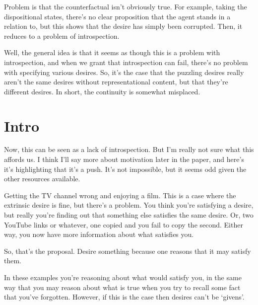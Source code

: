\documentclass[10pt]{article}
\begin{document}


{\color{red} Problem is that the counterfactual isn't obviously true.
  For example, taking the dispositional states, there's no clear proposition that the agent stands in a relation to, but this shows that the desire has simply been corrupted.
  Then, it reduces to a problem of introspection.}

{\color{blue} Well, the general idea is that it seems as though this is a problem with introspection, and when we grant that introspection can fail, there's no problem with specifying various desires.
  So, it's the case that the puzzling desires really aren't the same desires without representational content, but that they're different desires.
  In short, the continuity is somewhat misplaced.}



\section{Intro}
\label{sec:intro}

Now, this can be seen as a lack of introspection.
But I'm really not sure what this affords us.
I think I'll say more about motivation later in the paper, and here's it's highlighting that it's a push.
It's not impossible, but it seems odd given the other resources available.


Getting the TV channel wrong and enjoying a film.
This is a case where the extrinsic desire is fine, but there's a problem.
You think you're satisfying a desire, but really you're finding out that something else satisfies the same desire.
Or, two YouTube links or whatever, one copied and you fail to copy the second.
Either way, you now have more information about what satisfies you.

So, that's the proposal.
Desire something because one reasons that it may satisfy them.

In these examples you're reasoning about what would satisfy you, in the same way that you may reason about what is true when you try to recall some fact that you've forgotten.
However, if this is the case then desires can't be `givens'.
\end{document}
